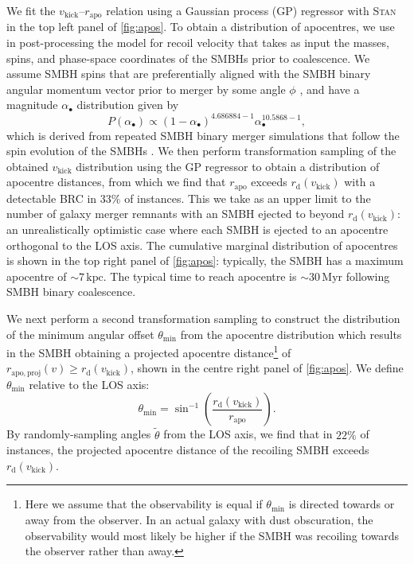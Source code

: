 \documentclass[twocolumn]{aastex631}
\newcommand{\rapo}{\ensuremath{r_\mathrm{apo}}}               %
\newcommand{\rapop}{\ensuremath{r_\mathrm{apo,proj}}}         %
\newcommand{\vk}{\ensuremath{v_\mathrm{kick}}}                %
\newcommand{\rdetect}{\ensuremath{r_\mathrm{d}(\vk)}}         %
\begin{document}
We fit the $\vk$--$\rapo$ relation using a Gaussian process (GP) regressor with \textsc{Stan} \citep{standevelopmentteam2018} in the top left panel of \autoref{fig:apos}.
To obtain a distribution of apocentres, we use in post-processing the \citet{zlochower2015} model for recoil velocity that takes as input the masses, spins, and phase-space coordinates of the SMBHs prior to coalescence.
We assume SMBH spins that are preferentially aligned with the SMBH binary angular momentum vector prior to merger by some angle $\phi$ \citep[which follows a right-skewed distribution with maximum at $\phi\sim25\fdg0$,][]{lousto2010}, and have a magnitude $\alpha_\bullet$ distribution given by
\begin{equation}
    P(\alpha_\bullet) \propto (1-\alpha_\bullet)^{4.686884-1} \alpha_\bullet^{10.5868-1},
\end{equation}
which is derived from repeated SMBH binary merger simulations that follow the spin evolution of the SMBHs \citep{lousto2010}.
We then perform transformation sampling of the obtained $\vk$ distribution using the GP regressor to obtain a distribution of apocentre distances, from which we find that $\rapo$ exceeds $\rdetect$ with a detectable BRC in 33\% of instances.
This we take as an upper limit to the number of galaxy merger remnants with an SMBH ejected to beyond $\rdetect$: an unrealistically optimistic case where each SMBH is ejected to an apocentre orthogonal to the LOS axis.
The cumulative marginal distribution of apocentres is shown in the top right panel of \autoref{fig:apos}: typically, the SMBH has a maximum apocentre of $\sim7\,\mathrm{kpc}$.
The typical time to reach apocentre is $\sim30\,\mathrm{Myr}$ following SMBH binary coalescence.

We next perform a second transformation sampling to construct the distribution of the minimum angular offset $\theta_\mathrm{min}$ from the apocentre distribution which results in the SMBH obtaining a projected apocentre distance\footnote{Here we assume that the observability is equal if $\theta_\mathrm{min}$ is directed towards or away from the observer. In an actual galaxy with dust obscuration, the observability would most likely be higher if the SMBH was recoiling towards the observer rather than away.} of $\rapop(v) \geq \rdetect$, shown in the centre right panel of \autoref{fig:apos}.
We define $\theta_\mathrm{min}$ relative to the LOS axis:
\begin{equation}
    \theta_\mathrm{min} = \sin^{-1}\left( \frac{\rdetect}{\rapo} \right).
\end{equation}
By randomly-sampling angles $\tilde{\theta}$ from the LOS axis, we find that in $22\%$ of instances, the projected apocentre distance of the recoiling SMBH exceeds $\rdetect$.
\end{document}
